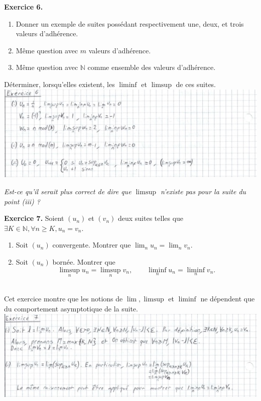 \documentclass[a4paper, 10pt]{report}
\begin{document}
	\vspace{5mm}
	\noindent
	\textbf{Exercice 6.} 
	\begin{enumerate}[label=(\roman*)]
		\item Donner un exemple de suites possédant respectivement
		une, deux, et trois valeurs d'adhérence.
		\item Même question avec $m$ valeurs d'adhérence.
		\item Même question avec $\mathbb{N}$ comme ensemble des
		valeurs d'adhérence.
	\end{enumerate}
	Déterminer, lorsqu'elles existent, les $\liminf$ et $\limsup$
	de ces suites.\\
	
	\includegraphics{ex06.jpg}
	\colorbox{solution}
	{\begin{minipage}{0.9\textwidth}
		\textit{\color{blue} Est-ce qu'il serait plus correct de
			dire que $\limsup$ n'existe pas pour la suite du point
			(iii) ?}\\
	\end{minipage}}
	
	\newpage
	
	\noindent
	\textbf{Exercice 7.} Soient $(u_n)$ et $(v_n)$ deux suites telles
	que $\exists K \in \mathbb{N}, \forall n \geq K, u_n = v_n$.
	\begin{enumerate}[label=(\roman*)]
		\item Soit $(u_n)$ convergente. Montrer que
		$\lim_n{u_n} = \lim_n{v_n}$.
		\item Soit $(u_n)$ bornée. Montrer que\\[-1em]
		\[
			\limsup_n{u_n} = \limsup_n{v_n}, \qquad
			\liminf_n{u_n} = \liminf_n{v_n}.
		\]\\[-3em]
	\end{enumerate}
	Cet exercice montre que les notions de $\lim, \limsup$ et $\liminf$
	ne dépendent que du comportement asymptotique de la suite.\\
	
	\includegraphics{ex07.jpg}
	
\end{document}
